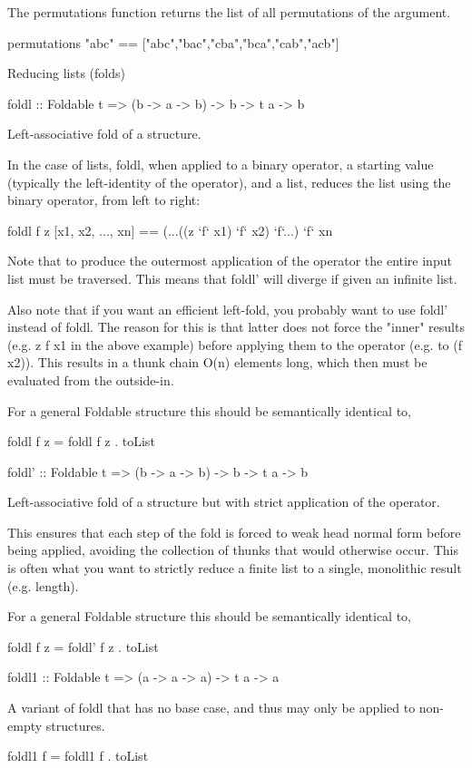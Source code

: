 The permutations function returns the list of all permutations of the argument.

permutations "abc" == ["abc","bac","cba","bca","cab","acb"]

Reducing lists (folds)

foldl :: Foldable t => (b -> a -> b) -> b -> t a -> b

Left-associative fold of a structure.

In the case of lists, foldl, when applied to a binary operator, a starting value (typically the left-identity of the operator), and a list, reduces the list using the binary operator, from left to right:

foldl f z [x1, x2, ..., xn] == (...((z `f` x1) `f` x2) `f`...) `f` xn

Note that to produce the outermost application of the operator the entire input list must be traversed. This means that foldl' will diverge if given an infinite list.

Also note that if you want an efficient left-fold, you probably want to use foldl' instead of foldl. The reason for this is that latter does not force the "inner" results (e.g. z f x1 in the above example) before applying them to the operator (e.g. to (f x2)). This results in a thunk chain O(n) elements long, which then must be evaluated from the outside-in.

For a general Foldable structure this should be semantically identical to,

foldl f z = foldl f z . toList

foldl' :: Foldable t => (b -> a -> b) -> b -> t a -> b

Left-associative fold of a structure but with strict application of the operator.

This ensures that each step of the fold is forced to weak head normal form before being applied, avoiding the collection of thunks that would otherwise occur. This is often what you want to strictly reduce a finite list to a single, monolithic result (e.g. length).

For a general Foldable structure this should be semantically identical to,

foldl f z = foldl' f z . toList

foldl1 :: Foldable t => (a -> a -> a) -> t a -> a

A variant of foldl that has no base case, and thus may only be applied to non-empty structures.

foldl1 f = foldl1 f . toList

